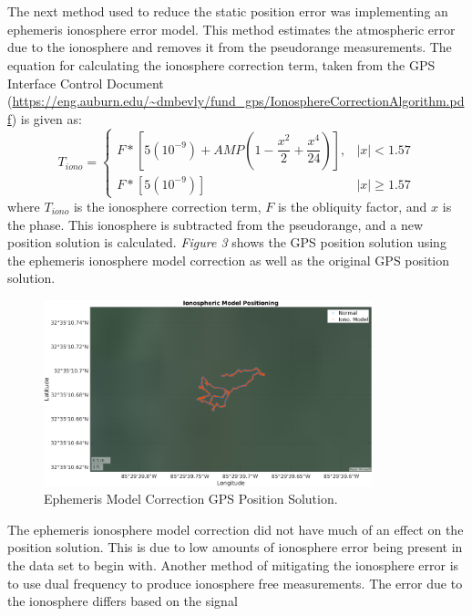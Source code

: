 \documentclass[11pt]{article}
\begin{document}
\begin{enumerate}[label=\textbf{\arabic*.}]
    \\ \\
    The next method used to reduce the static position error was implementing an 
    ephemeris ionosphere error model. This method estimates the atmospheric error 
    due to the ionosphere and removes it from the pseudorange measurements. The 
    equation for calculating the ionosphere correction term, taken from the GPS 
    Interface Control Document 
    (\url{https://eng.auburn.edu/~dmbevly/fund_gps/IonosphereCorrectionAlgorithm.pdf}) 
    is given as:
    \begin{equation}
      T_{iono}=
      \begin{cases}
        F*\left[5(10^{-9})+AMP(1-\dfrac{x^2}{2}+\dfrac{x^4}{24})\right], & |x|<1.57 \\
        F*\left[5(10^{-9})\right] & |x|\geq 1.57
      \end{cases}
    \end{equation}
    where $T_{iono}$ is the ionosphere correction term, $F$ is the obliquity 
    factor, and $x$ is the phase. This ionosphere is subtracted from the 
    pseudorange, and a new position solution is calculated. \emph{Figure 3} shows 
    the GPS position solution using the ephemeris ionosphere model correction as 
    well as the original GPS position solution.
    \begin{figure}[H]
      \centering
      \includegraphics[width=0.85\textwidth]{p1_c.png}
      \caption{Ephemeris Model Correction GPS Position Solution.}
    \end{figure}
    The ephemeris ionosphere model correction did not have much of an effect 
    on the position solution. This is due to low amounts of ionosphere error 
    being present in the data set to begin with. Another method of mitigating 
    the ionosphere error is to use dual frequency to produce ionosphere free 
    measurements. The error due to the ionosphere differs based on the signal 

\end{enumerate}
\end{document}
